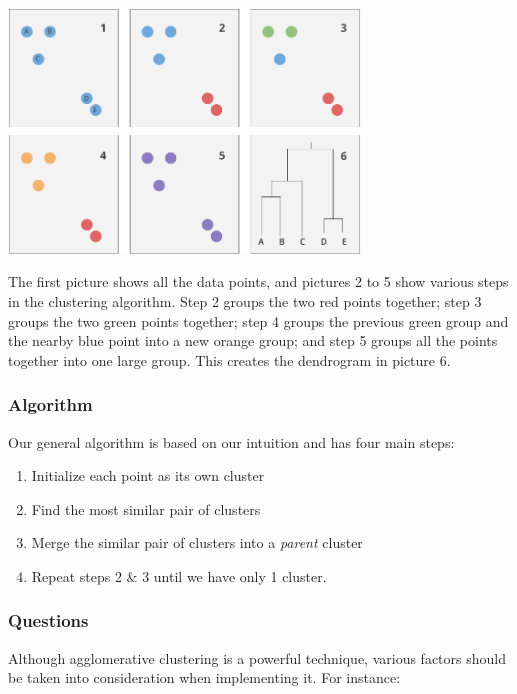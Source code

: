 \documentclass{article}
\begin{document}
\begin{minipage}{\linewidth}
\begin{center}
\includegraphics[width=0.70\textwidth]{dendrogram2.png}
\end{center}
\end{minipage}

The first picture shows all the data points, and pictures 2 to 5 show various steps in the clustering algorithm. Step 2 groups the two red points together; step 3 groups the two green points together; step 4 groups the previous green group and the nearby blue point into a new orange group; and step 5 groups all the points together into one large group. This creates the dendrogram in picture 6.

\subsubsection{Algorithm}

Our general algorithm is based on our intuition and has four main steps:

\begin{enumerate}
	\item Initialize each point as its own cluster
	\item Find the most similar pair of clusters
	\item Merge the similar pair of clusters into a \textit{parent} cluster
	\item Repeat steps 2 \& 3 until we have only 1 cluster.
\end{enumerate}

\subsubsection{Questions}

Although agglomerative clustering is a powerful technique, various factors should be taken into consideration when implementing it. For instance:
\end{document}
